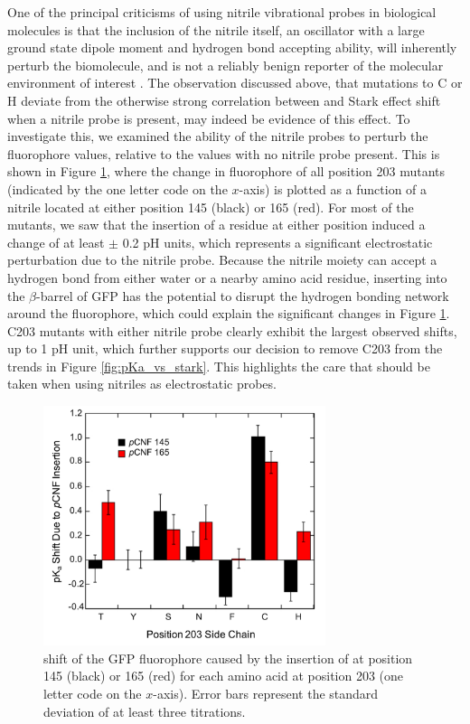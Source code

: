 One of the principal criticisms of using nitrile vibrational probes in biological molecules is that the inclusion of the nitrile itself, an oscillator with a large ground state dipole moment and hydrogen bond accepting ability, will inherently perturb the biomolecule, and is not a reliably benign reporter of the molecular environment of interest \cite{Adhikary2014}.
The observation discussed above, that mutations to C or H deviate from the otherwise strong correlation between \pKa{} and Stark effect shift when a nitrile probe is present, may indeed be evidence of this effect.
To investigate this, we examined the ability of the nitrile probes to perturb the fluorophore \pKa{} values, relative to the values with no nitrile probe present.
This is shown in Figure \ref{fig:pKa_sidechain}, where the change in fluorophore \pKa{} of all position 203 mutants (indicated by the one letter code on the $x$-axis) is plotted as a function of a nitrile located at either position 145 (black) or 165 (red).
For most of the mutants, we saw that the insertion of a \pCNF{} residue at either position induced a \pKa{} change of at least $\pm$ 0.2 pH units, which represents a significant electrostatic perturbation due to the nitrile probe.
Because the nitrile moiety can accept a hydrogen bond from either water or a nearby amino acid residue, inserting \pCNF{} into the $\beta$-barrel of GFP has the potential to disrupt the hydrogen bonding network around the fluorophore, which could explain the significant \pKa{} changes in Figure \ref{fig:pKa_sidechain}.
C203 mutants with either nitrile probe clearly exhibit the largest observed \pKa{} shifts, up to 1 pH unit, which further supports our decision to remove C203 from the trends in Figure \ref{fig:pKa_vs_stark}.
This highlights the care that should be taken when using nitriles as electrostatic probes.

\begin{figure}
    \center
    \includegraphics[width=3.25in]{figures-gfp-pKa/pKa_by_side_chain.png}
    \caption{\pKa{} shift of the GFP fluorophore caused by the insertion of \pCNF{} at position 145 (black) or 165 (red) for each amino acid at position 203 (one letter code on the $x$-axis). Error bars represent the standard deviation of at least three titrations.}
    \label{fig:pKa_sidechain}
\end{figure}

